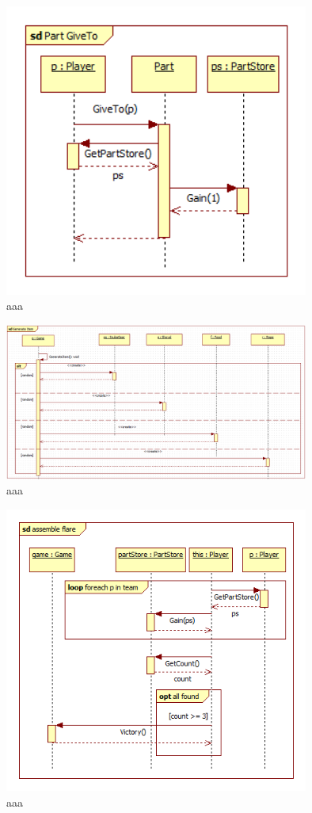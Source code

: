 \begin{figure}[H]
	\begin{center}
		\includegraphics[width=10cm]{chapters/chapter03/seqdiag/Part_GiveTo.png}
		\caption{aaa}
		\label{bbb}
	\end{center}
\end{figure}
\begin{figure}[H]
	\begin{center}
		\includegraphics[width=10cm]{chapters/chapter03/seqdiag/Game_generate_item.png}
		\caption{aaa}
		\label{bbb}
	\end{center}
\end{figure}
\begin{figure}[H]
	\begin{center}
		\includegraphics[width=10cm]{chapters/chapter03/seqdiag/Player_assemble_flare.png}
		\caption{aaa}
		\label{bbb}
	\end{center}
\end{figure}
